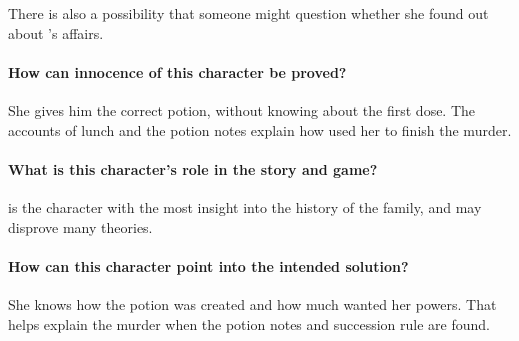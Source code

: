 {{There is also a possibility that someone might question whether she found out about 's affairs.

\paragraph{How can innocence of this character be proved?}

She gives him the correct potion, without knowing about the first dose. The accounts of lunch and the potion notes explain how  used her to finish the murder.

\paragraph{What is this character's role in the story and game?}

 is the character with the most insight into the history of the family, and may disprove many theories.

\paragraph{How can this character point into the intended solution?}

She knows how the potion was created and how much  wanted her powers. That helps explain the murder when the potion notes and succession rule are found.

}


}

